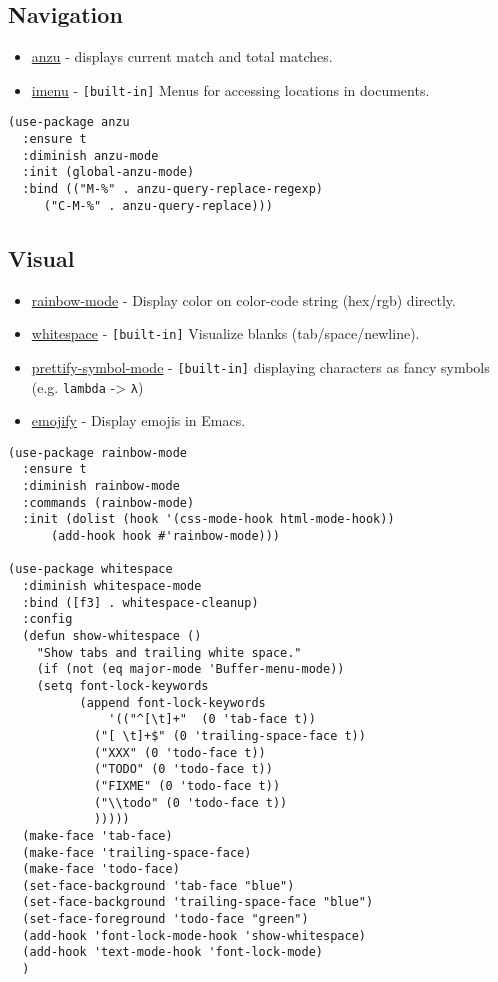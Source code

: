 \documentclass[11pt]{article}
\begin{document}
\subsection{Navigation}
\label{sec-1-3}
\begin{itemize}
\item \href{https://github.com/syohex/emacs-anzu}{anzu} - displays current match and total matches.
\item \href{http://www.emacswiki.org/emacs/ImenuMode}{imenu} - \texttt{[built-in]} Menus for accessing locations in documents.
\end{itemize}

\begin{verbatim}
(use-package anzu
  :ensure t
  :diminish anzu-mode
  :init (global-anzu-mode)
  :bind (("M-%" . anzu-query-replace-regexp)
	 ("C-M-%" . anzu-query-replace)))
\end{verbatim}

\subsection{Visual}
\label{sec-1-4}
\begin{itemize}
\item \href{https://julien.danjou.info/projects/emacs-packages}{rainbow-mode} - Display color on color-code string (hex/rgb) directly.
\item \href{http://www.emacswiki.org/emacs/WhiteSpace}{whitespace} - \texttt{[built-in]} Visualize blanks (tab/space/newline).
\item \href{http://emacsredux.com/blog/2014/08/25/a-peek-at-emacs-24-dot-4-prettify-symbols-mode/}{prettify-symbol-mode} - \texttt{[built-in]} displaying characters as fancy symbols (e.g. \texttt{lambda} -> \texttt{λ})
\item \href{https://github.com/iqbalansari/emacs-emojify}{emojify} - Display emojis in Emacs.
\end{itemize}

\begin{verbatim}
(use-package rainbow-mode
  :ensure t
  :diminish rainbow-mode
  :commands (rainbow-mode)
  :init (dolist (hook '(css-mode-hook html-mode-hook))
	  (add-hook hook #'rainbow-mode)))

(use-package whitespace
  :diminish whitespace-mode
  :bind ([f3] . whitespace-cleanup)
  :config
  (defun show-whitespace ()
    "Show tabs and trailing white space."
    (if (not (eq major-mode 'Buffer-menu-mode))
	(setq font-lock-keywords
	      (append font-lock-keywords
		      '(("^[\t]+"  (0 'tab-face t))
			("[ \t]+$" (0 'trailing-space-face t))
			("XXX" (0 'todo-face t))
			("TODO" (0 'todo-face t))
			("FIXME" (0 'todo-face t))
			("\\todo" (0 'todo-face t))
			)))))
  (make-face 'tab-face)
  (make-face 'trailing-space-face)
  (make-face 'todo-face)
  (set-face-background 'tab-face "blue")
  (set-face-background 'trailing-space-face "blue")
  (set-face-foreground 'todo-face "green")
  (add-hook 'font-lock-mode-hook 'show-whitespace)
  (add-hook 'text-mode-hook 'font-lock-mode)
  )
\end{verbatim}
\end{document}
